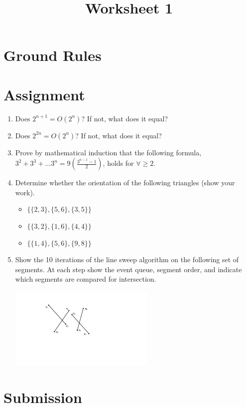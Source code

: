 \documentclass[a4paper,12pt]{article}
\title{Worksheet 1}
\begin{document}
\maketitle


\vspace{5pt}
\section{Ground Rules}


\vspace{5pt}
\section{Assignment}

\begin{enumerate}
\item Does $2^{n+1}=O(2^n)$? If not, what does it equal?

\item Does $2^{2n}=O(2^n)$? If not, what does it equal?

\item Prove by mathematical induction that the following formula, $3^2+3^3+...3^n=9\left( \frac{3^{n-1}-1}{2} \right)$, holds for $\forall \geq 2$.

\item Determine whether the orientation of the following triangles (show your work).


\begin{itemize}
\item $\{\{2,3\},\{5,6\},\{3,5\}\}$
\item $\{\{3,2\},\{1,6\},\{4,4\}\}$
\item $\{\{1,4\},\{5,6\},\{9,8\}\}$
\end{itemize}


\item Show the 10 iterations of the line sweep algorithm on the following set of segments. At each step show the event queue, segment order, and indicate which segments are compared for intersection.

\includegraphics[width=7cm]{../images/linesweep.pdf}
\end{enumerate}


\section{Submission}

\end{document}
